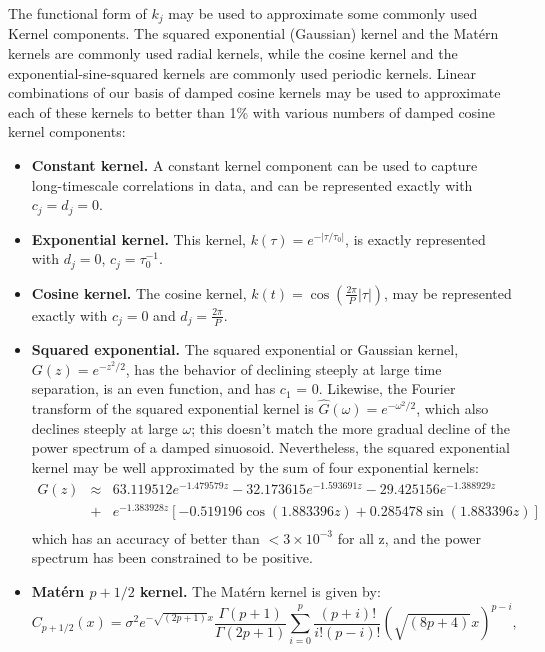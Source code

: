 \documentclass[manuscript, letterpaper]{aastex6}
\begin{document}
The functional form of $k_j$ may be used to approximate some commonly used Kernel components.
The squared exponential (Gaussian) kernel and the Mat\'ern kernels are commonly
used radial kernels, while the cosine kernel and the exponential-sine-squared kernels are
commonly used periodic kernels.  Linear combinations of our basis of damped cosine kernels may be
used to approximate each of these kernels to better than 1\% with various numbers of damped
cosine kernel components:
\begin{itemize}
\item {\bf Constant kernel.} A constant kernel component can be used to capture long-timescale
correlations in data, and can be represented exactly with $c_j= d_j =  0$.
\item {\bf Exponential kernel.} This kernel, $k(\tau) = e^{-\vert \tau/\tau_0\vert}$, is exactly
represented with $d_j=0$, $c_j= \tau_0^{-1}$.
\item {\bf Cosine kernel.} The cosine kernel, $k(t) = \cos{\left(\frac{2\pi}{P} \vert \tau \vert\right)}$,
may be represented exactly with $c_j=0$ and $d_j= \frac{2\pi}{P}$.
\item {\bf Squared exponential.} The squared exponential or Gaussian kernel, $G(z)=e^{-z^2/2}$,
has the behavior of declining steeply at large time separation, is an even function, and has $c_1$ = 0.
Likewise, the Fourier transform of the squared exponential kernel is $\hat G(\omega) = e^{-\omega^2/2}$,
which also declines steeply at large $\omega$;  this doesn't match the more gradual decline of the
power spectrum of a damped sinuosoid.  Nevertheless, the squared exponential kernel may be well approximated
by the sum of four exponential kernels:
\begin{eqnarray}
G(z) &\approx& 63.119512 e^{-1.479579 z} -32.173615 e^{-1.593691 z} -29.425156 e^{-1.388929 z}\\
&+& e^{-1.383928 z} \left[-0.519196\cos{(1.883396 z)} +0.285478 \sin{(1.883396 z)}\right] \\
\end{eqnarray}
which has an accuracy of better than $<3\times 10^{-3}$ for all z, and the power spectrum has
been constrained to be positive.
\item {\bf Mat\'ern $p+1/2$ kernel.}  The Mat\'ern kernel is given by:
\begin{equation}
C_{p+1/2}(x) = \sigma^2 e^{-\sqrt{(2p+1)}x} \frac{\Gamma(p+1)}{\Gamma(2p+1)}
\sum_{i=0}^p \frac{(p+i)!}{i!(p-i)!} (\sqrt{(8p+4)}x)^{p-i},
\end{equation}

\end{itemize}
\end{document}
